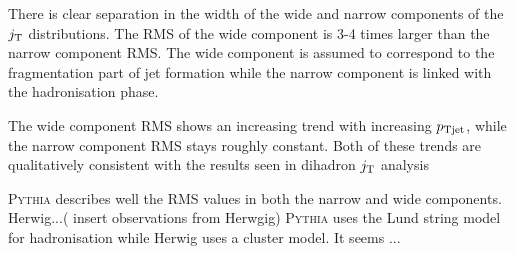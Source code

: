 There is clear separation in the width of the wide and narrow components of the $j_{\rm T}$ distributions. The RMS of the wide component is 3-4 times larger than the narrow component RMS. The wide component is assumed to correspond to the fragmentation part of jet formation while the narrow component is linked with the hadronisation phase.

The wide component RMS shows an increasing trend with increasing $p_{\rm Tjet}$, while the narrow component RMS stays roughly constant. Both of these trends are qualitatively consistent with the results seen in dihadron $j_{\rm T}$ analysis~\cite{ALICEjt}

\textsc{Pythia} describes well the RMS values in both the narrow and wide components. Herwig...({\color{red} insert observations from Herwgig}) \textsc{Pythia} uses the Lund string model for hadronisation while Herwig uses a cluster model. It seems ... 


